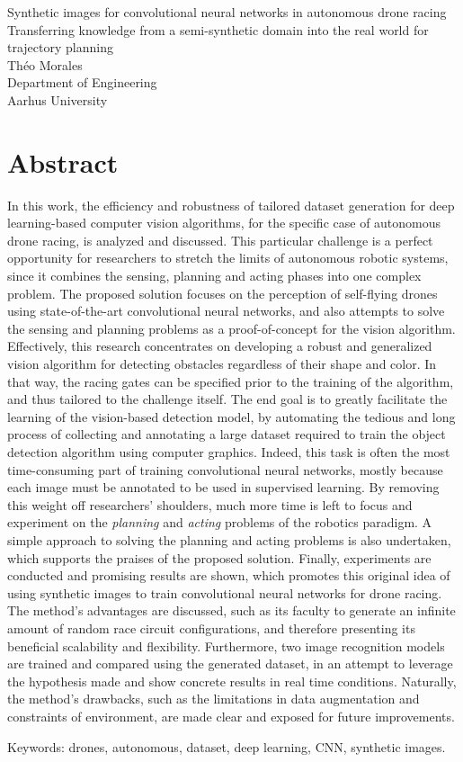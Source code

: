 Synthetic images for convolutional neural networks in autonomous
drone racing \\
Transferring knowledge from a semi-synthetic domain into the real world for
trajectory planning\\
Théo Morales\\
Department of Engineering\\
Aarhus University \setlength{\parskip}{0.5cm}

\thispagestyle{plain}			%
\setlength{\parskip}{0pt plus 1.0pt}
\section*{Abstract}

In this work, the efficiency and robustness of tailored dataset generation for
deep learning-based computer vision algorithms, for the specific case of
autonomous drone racing, is analyzed and discussed. This particular challenge
is a perfect opportunity for researchers to stretch the limits of autonomous
robotic systems, since it combines the sensing, planning and acting phases into
one complex problem. The proposed solution focuses on the perception of self-flying
drones using state-of-the-art convolutional neural networks, and also attempts
to solve the sensing and planning problems as a proof-of-concept for the vision
algorithm. Effectively,
this research concentrates on developing a robust and generalized vision
algorithm for detecting obstacles regardless of their shape and color. In that
way, the racing gates can be specified prior to the training of the algorithm,
and thus tailored to the challenge itself. The end goal is to greatly
facilitate the learning of the vision-based detection model, by automating the
tedious and long process of collecting and annotating a large dataset required
to train the object detection algorithm using computer graphics. Indeed, this task
is often the most time-consuming part of training convolutional neural
networks, mostly because each image must be annotated to be used in supervised
learning. By removing this weight off researchers' shoulders, much more time is
left to focus and experiment on the \emph{planning} and \emph{acting} problems
of the robotics paradigm. A simple approach to solving the planning and acting
problems is also undertaken, which supports the praises of the proposed
solution. Finally, experiments are conducted and promising results are shown,
which promotes this original idea of using synthetic images to
train convolutional neural networks for drone racing. The method's advantages
are discussed, such as its faculty to generate an infinite amount of random
race circuit configurations, and therefore presenting its beneficial
scalability and flexibility. Furthermore, two image recognition models are
trained and compared using the generated dataset, in an attempt to leverage the
hypothesis made and show concrete results in real time conditions.
Naturally, the method's drawbacks, such as the limitations in data augmentation
and constraints of environment, are made clear and exposed for future
improvements.

\vfill
Keywords: drones, autonomous, dataset, deep learning, CNN, synthetic images.

